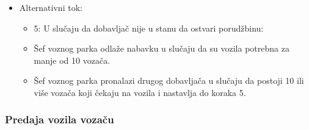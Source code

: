 \begin{itemize}
	\item Alternativni tok:
		\begin{itemize}
		    \item 5: U slučaju da dobavljač nije u stanu da ostvari porudžbinu:
			\item Šef voznog parka odlaže nabavku u slučaju da su vozila potrebna za manje od 10 vozača.
			\item Šef voznog parka pronalazi drugog dobavljača u slučaju da postoji 10 ili više vozača koji čekaju na vozila i nastavlja do koraka 5.
		\end{itemize}

\end{itemize}

\subsubsection{\bfseries Predaja vozila vozaču}
